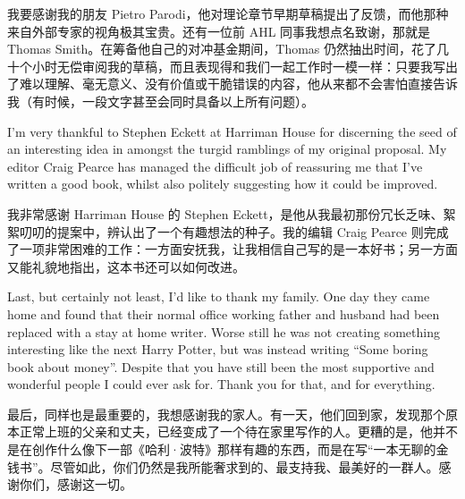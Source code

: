 \begin{chineseblock}我要感谢我的朋友 Pietro Parodi，他对理论章节早期草稿提出了反馈，而他那种来自外部专家的视角极其宝贵。还有一位前 AHL 同事我想点名致谢，那就是 Thomas Smith。在筹备他自己的对冲基金期间，Thomas 仍然抽出时间，花了几十个小时无偿审阅我的草稿，而且表现得和我们一起工作时一模一样：只要我写出了难以理解、毫无意义、没有价值或干脆错误的内容，他从来都不会害怕直接告诉我（有时候，一段文字甚至会同时具备以上所有问题）。\end{chineseblock}

\bipairgap

\begin{englishblock} I'm very thankful to Stephen Eckett at Harriman House for discerning the seed of an interesting idea in amongst the turgid ramblings of my original proposal. My editor Craig Pearce has managed the difficult job of reassuring me that I've written a good book, whilst also politely suggesting how it could be improved. \end{englishblock}

\begin{chineseblock}我非常感谢 Harriman House 的 Stephen Eckett，是他从我最初那份冗长乏味、絮絮叨叨的提案中，辨认出了一个有趣想法的种子。我的编辑 Craig Pearce 则完成了一项非常困难的工作：一方面安抚我，让我相信自己写的是一本好书；另一方面又能礼貌地指出，这本书还可以如何改进。\end{chineseblock}

\bipairgap

\begin{englishblock} Last, but certainly not least, I'd like to thank my family. One day they came home and found that their normal office working father and husband had been replaced with a stay at home writer. Worse still he was not creating something interesting like the next Harry Potter, but was instead writing ``Some boring book about money''. Despite that you have still been the most supportive and wonderful people I could ever ask for. Thank you for that, and for everything. \end{englishblock}

\begin{chineseblock}最后，同样也是最重要的，我想感谢我的家人。有一天，他们回到家，发现那个原本正常上班的父亲和丈夫，已经变成了一个待在家里写作的人。更糟的是，他并不是在创作什么像下一部《哈利·波特》那样有趣的东西，而是在写“一本无聊的金钱书”。尽管如此，你们仍然是我所能奢求到的、最支持我、最美好的一群人。感谢你们，感谢这一切。\end{chineseblock}
